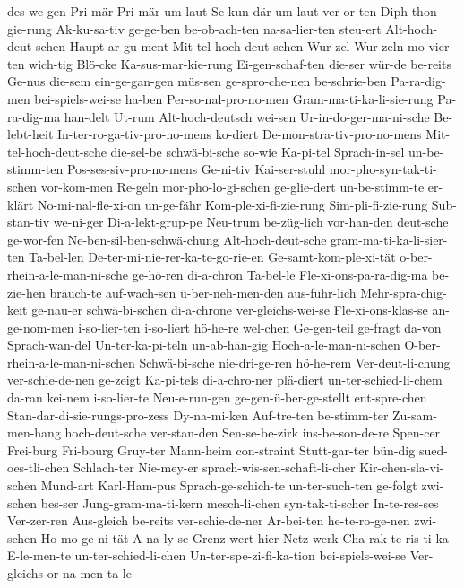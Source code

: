 {des-we-gen
Pri-mär
Pri-mär-um-laut
Se-kun-där-um-laut
ver-or-ten
Diph-thon-gie-rung
Ak-ku-sa-tiv
ge-ge-ben
be-ob-ach-ten
na-sa-lier-ten
steu-ert
Alt-hoch-deut-schen
Haupt-ar-gu-ment
Mit-tel-hoch-deut-schen
Wur-zel
Wur-zeln
mo-vier-ten
wich-tig
Blö-cke
Ka-sus-mar-kie-rung
Ei-gen-schaf-ten
die-ser
wür-de
be-reits
Ge-nus
die-sem
ein-ge-gan-gen
müs-sen
ge-spro-che-nen
be-schrie-ben
Pa-ra-dig-men
bei-spiels-wei-se
ha-ben
Per-so-nal-pro-no-men
Gram-ma-ti-ka-li-sie-rung
Pa-ra-dig-ma
han-delt
Ut-rum
Alt-hoch-deutsch
wei-sen
Ur-in-do-ger-ma-ni-sche
Be-lebt-heit
In-ter-ro-ga-tiv-pro-no-mens
ko-diert
De-mon-stra-tiv-pro-no-mens
Mit-tel-hoch-deut-sche
die-sel-be
schwä-bi-sche
so-wie
Ka-pi-tel
Sprach-in-sel
un-be-stimm-ten
Pos-ses-siv-pro-no-mens
Ge-ni-tiv
Kai-ser-stuhl
mor-pho-syn-tak-ti-schen
vor-kom-men
Re-geln
mor-pho-lo-gi-schen
ge-glie-dert
un-be-stimm-te
er-klärt
No-mi-nal-fle-xi-on
un-ge-fähr
Kom-ple-xi-fi-zie-rung
Sim-pli-fi-zie-rung
Sub-stan-tiv
we-ni-ger
Di-a-lekt-grup-pe
Neu-trum
be-züg-lich
vor-han-den
deut-sche
ge-wor-fen
Ne-ben-sil-ben-schwä-chung
Alt-hoch-deut-sche
gram-ma-ti-ka-li-sier-ten
Ta-bel-len
De-ter-mi-nie-rer-ka-te-go-rie-en
Ge-samt-kom-ple-xi-tät
o-ber-rhein-a-le-man-ni-sche
ge-hö-ren
di-a-chron
Ta-bel-le
Fle-xi-ons-pa-ra-dig-ma
be-zie-hen
bräuch-te
auf-wach-sen
ü-ber-neh-men-den
aus-führ-lich
Mehr-spra-chig-keit
ge-nau-er
schwä-bi-schen
di-a-chrone
ver-gleichs-wei-se
Fle-xi-ons-klas-se
an-ge-nom-men
i-so-lier-ten
i-so-liert
hö-he-re
wel-chen
Ge-gen-teil
ge-fragt
da-von
Sprach-wan-del
Un-ter-ka-pi-teln
un-ab-hän-gig
Hoch-a-le-man-ni-schen
O-ber-rhein-a-le-man-ni-schen
Schwä-bi-sche
nie-dri-ge-ren
hö-he-rem
Ver-deut-li-chung
ver-schie-de-nen
ge-zeigt
Ka-pi-tels
di-a-chro-ner
plä-diert
un-ter-schied-li-chem
da-ran
kei-nem
i-so-lier-te
Neu-e-run-gen
ge-gen-ü-ber-ge-stellt
ent-spre-chen
Stan-dar-di-sie-rungs-pro-zess
Dy-na-mi-ken
Auf-tre-ten
be-stimm-ter
Zu-sam-men-hang
hoch-deut-sche
ver-stan-den
Sen-se-be-zirk
ins-be-son-de-re
Spen-cer
Frei-burg
Fri-bourg
Gruy-ter
Mann-heim
con-straint
Stutt-gar-ter
bün-dig
sued-oes-tli-chen
Schlach-ter
Nie-mey-er
sprach-wis-sen-schaft-li-cher
Kir-chen-sla-vi-schen
Mund-art
Karl-Ham-pus
Sprach-ge-schich-te
un-ter-such-ten
ge-folgt
zwi-schen
bes-ser
Jung-gram-ma-ti-kern
mesch-li-chen
syn-tak-ti-scher
In-te-res-ses
Ver-zer-ren
Aus-gleich
be-reits
ver-schie-de-ner
Ar-bei-ten
he-te-ro-ge-nen
zwi-schen
Ho-mo-ge-ni-tät
A-na-ly-se
Grenz-wert
hier
Netz-werk
Cha-rak-te-ris-ti-ka
E-le-men-te
un-ter-schied-li-chen
Un-ter-spe-zi-fi-ka-tion
bei-spiels-wei-se
Ver-gleichs
or-na-men-ta-le
}
